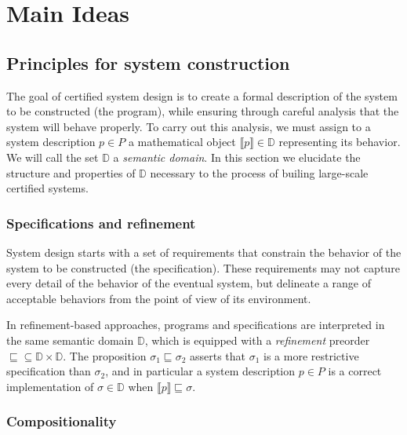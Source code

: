 \documentclass[acmsmall,timestamp,review,anonymous]{acmart}
\begin{document}


\section{Main Ideas} \label{sec:mainideas} %

\subsection{Principles for system construction} %


The goal of certified system design is
to create a formal description of
the system to be constructed (the program),
while ensuring through careful analysis that the system
will behave properly.
To carry out this analysis,
we must assign
to a system description $p \in P$
a mathematical object $\llbracket p \rrbracket \in \mathbb{D}$
representing its behavior.
We will call the set $\mathbb{D}$ a \emph{semantic domain}.
In this section we elucidate
the structure and properties of $\mathbb{D}$
necessary to the process of builing
large-scale certified systems.


\subsubsection{Specifications and refinement} %

System design starts with a set of requirements
that constrain the behavior of the system to be constructed
(the specification).
These requirements may not capture every detail
of the behavior of the eventual system,
but delineate a range of acceptable behaviors
from the point of view of its environment.

In refinement-based approaches,
programs and specifications are interpreted in the same
semantic domain $\mathbb{D}$,
which is equipped with a \emph{refinement} preorder
${\sqsubseteq} \subseteq \mathbb{D} \times \mathbb{D}$.
The proposition $\sigma_1 \sqsubseteq \sigma_2$
asserts that $\sigma_1$ is a more restrictive specification than $\sigma_2$,
and in particular a system description $p \in P$ is a correct implementation
of $\sigma \in \mathbb{D}$ when
$\llbracket p \rrbracket \sqsubseteq \sigma$.


\subsubsection{Compositionality} %
\end{document}
